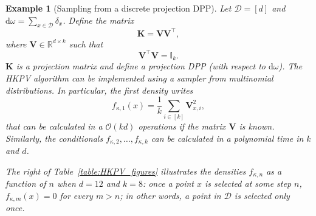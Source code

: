 \documentclass[twoside,11pt]{book}
\newtheorem{example}{Example}
\numberwithin{theorem}{chapter}
\numberwithin{definition}{chapter}
\numberwithin{proposition}{chapter}
\numberwithin{corollary}{chapter}
\numberwithin{example}{chapter}
\numberwithin{lemma}{chapter}
\numberwithin{assumption}{chapter}
\numberwithin{equation}{chapter}
\numberwithin{figure}{chapter}
\DeclareMathOperator{\Tran}{\intercal}
\begin{document}
 \begin{example}[Sampling from a discrete projection DPP]
Let $\mathcal{D} = [d]$ and $\mathrm{d}\omega = \sum\limits_{x \in \mathcal{D}} \delta_{x}$. Define the matrix
\begin{equation}
\bm{K} = \bm{V}\bm{V}^{\Tran},
\end{equation} 
where $\bm{V}\in \mathbb{R}^{d \times k}$ such that
\begin{equation}
\bm{V}^{\Tran}\bm{V} = \mathbb{I}_{k}.
\end{equation}
$\bm{K}$ is a projection matrix and define a projection DPP (with respect to $\mathrm{d}\omega$). The HKPV algorithm can be implemented using a sampler from multinomial distributions. In particular, the first density writes
\begin{equation}
f_{\kappa,1}(x) = \frac{1}{k} \sum\limits_{i \in [k]} \bm{V}_{x,i}^{2},
\end{equation}
that can be calculated in a $\mathcal{O}(kd)$ operations if the matrix $\bm{V}$ is known. Similarly, the conditionals $f_{\kappa,2}, \dots, f_{\kappa,k}$ can be calculated in a polynomial time in $k$ and $d$. 

The right of Table~\ref{table:HKPV_figures} illustrates the  densities $f_{\kappa,n}$ as a function of $n$ when $d = 12$ and $k = 8$: once a point $x$ is selected at some step $n$, $f_{\kappa,m}(x) = 0$ for every $m>n$; in other words, a point in $\mathcal{D}$ is selected only once.
 \end{example}
\end{document}
